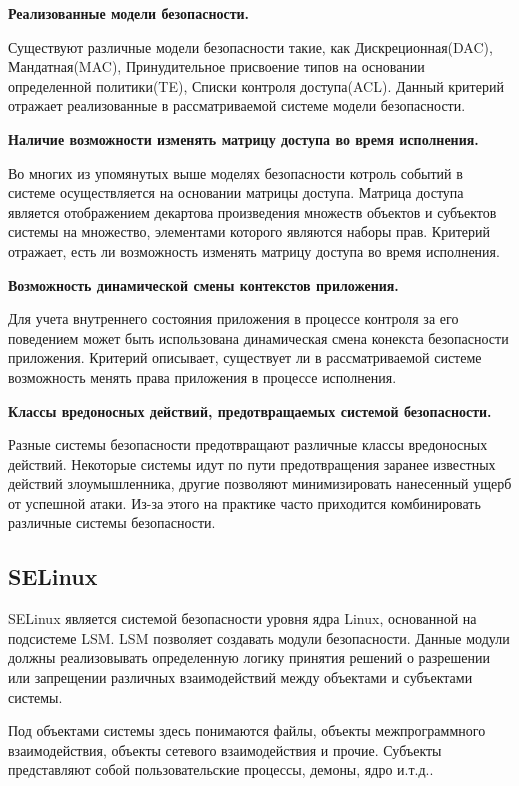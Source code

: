 \bigskip
{\bfseries Реализованные модели безопасности.} 

    Существуют различные модели безопасности такие, 
    как Дискреционная(DAC), Мандатная(MAC), Принудительное 
    присвоение типов на основании определенной 
    политики(TE), Списки контроля доступа(ACL). 
    Данный критерий отражает реализованные 
    в рассматриваемой системе модели безопасности.  

\bigskip
{\bfseries Наличие возможности изменять матрицу доступа 
	во время исполнения.}
	
	Во многих из упомянутых выше моделях безопасности 
	котроль событий в системе осуществляется на основании 
	матрицы доступа. Матрица доступа является отображением 
	декартова произведения множеств объектов и субъектов 
	системы на множество, элементами которого являются 
	наборы прав.
	Критерий отражает, есть ли возможность изменять
	матрицу доступа во время исполнения. 

\bigskip 
{\bfseries Возможность динамической смены контекстов
	приложения.}
	
	Для учета внутреннего состояния приложения в 
	процессе контроля за его поведением может быть
	использована динамическая смена конекста безопасности 
	 приложения. 
	Критерий описывает, существует ли в рассматриваемой 
	системе возможность менять права приложения в процессе
	исполнения. 

\bigskip
{\bfseries Классы вредоносных действий, предотвращаемых 
	системой безопасности.}
	
	Разные системы безопасности предотвращают различные 
	классы вредоносных действий. Некоторые системы 
	идут по пути предотвращения заранее известных 
	действий злоумышленника, другие позволяют минимизировать 
	нанесенный ущерб от успешной атаки. Из-за этого на практике 
	часто приходится комбинировать различные системы безопасности.    

\bigskip
\subsection{SELinux} 
SELinux является системой безопасности 
уровня ядра Linux, основанной на 
подсистеме LSM. LSM позволяет 
создавать модули безопасности. Данные модули 
должны реализовывать 
определенную логику принятия решений о 
разрешении или запрещении различных 
взаимодействий между объектами и субъектами 
системы. 

Под объектами системы здесь 
понимаются файлы, объекты межпрограммного 
взаимодействия, объекты сетевого взаимодействия 
и прочие. Субъекты представляют собой 
пользовательские процессы, демоны, ядро и.т.д..

